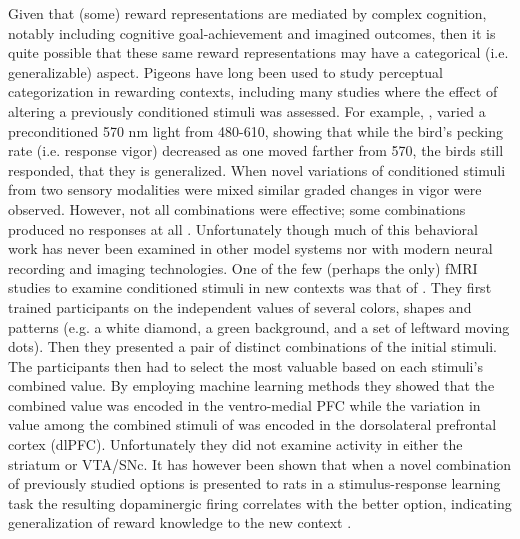 \documentclass[doc,12pt]{apa}        %
\begin{document}
Given that (some) reward representations are mediated by complex cognition, notably including cognitive goal-achievement and imagined outcomes,  then it is quite possible that these same reward representations may have a categorical (i.e. generalizable) aspect.  Pigeons have long been used to study perceptual categorization in rewarding contexts, including many studies where the effect of altering a previously conditioned stimuli was assessed.  For example, , varied a preconditioned 570 nm light from 480-610, showing that while the bird's pecking rate (i.e. response vigor) decreased as one moved farther from 570, the birds still responded, that they is generalized.  When novel variations of conditioned stimuli from two sensory modalities were mixed similar graded changes in vigor were observed. However, not all combinations were effective; some combinations produced no responses at all \cite{Blough:2001p8408,Simmons:2008p8405,Urcuioli:2001p8359}.  Unfortunately though much of this behavioral work has never been examined in other model systems nor with modern neural recording and imaging technologies.  One of the few (perhaps the only) fMRI studies to examine conditioned stimuli in new contexts was that of . They first trained participants on the independent values of several colors, shapes and patterns (e.g. a white diamond, a green background, and a set of leftward moving dots).  Then they presented a pair of distinct combinations of the initial stimuli.  The participants then had to select the most valuable based on each stimuli's combined value.  By employing machine learning methods they showed that the combined value was encoded in the ventro-medial PFC while the variation in value among the combined stimuli of was encoded in the dorsolateral prefrontal cortex (dlPFC).  Unfortunately they did not examine activity in either the striatum or VTA/SNc.  It has however been shown that when a novel combination of previously studied options is presented to rats in a stimulus-response learning task the resulting dopaminergic firing correlates with the better option, indicating generalization of reward knowledge to the new context \cite{Roesch:2007p2519}.

\end{document}
